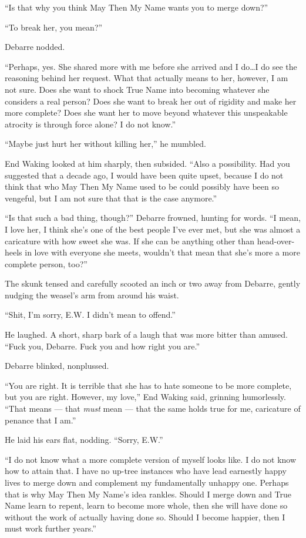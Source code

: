 ``Is that why you think May Then My Name wants you to merge down?''

``To break her, you mean?''

Debarre nodded.

``Perhaps, yes. She shared more with me before she arrived and I do\ldots I do see the reasoning behind her request. What that actually means to her, however, I am not sure. Does she want to shock True Name into becoming whatever she considers a real person? Does she want to break her out of rigidity and make her more complete? Does she want her to move beyond whatever this unspeakable atrocity is through force alone? I do not know.''

``Maybe just hurt her without killing her,'' he mumbled.

End Waking looked at him sharply, then subsided. ``Also a possibility. Had you suggested that a decade ago, I would have been quite upset, because I do not think that who May Then My Name used to be could possibly have been so vengeful, but I am not sure that that is the case anymore.''

``Is that such a bad thing, though?'' Debarre frowned, hunting for words. ``I mean, I love her, I think she's one of the best people I've ever met, but she was almost a caricature with how sweet she was. If she can be anything other than head-over-heels in love with everyone she meets, wouldn't that mean that she's more a more complete person, too?''

The skunk tensed and carefully scooted an inch or two away from Debarre, gently nudging the weasel's arm from around his waist.

``Shit, I'm sorry, E.W. I didn't mean to offend.''

He laughed. A short, sharp bark of a laugh that was more bitter than amused. ``Fuck you, Debarre. Fuck you and how right you are.''

Debarre blinked, nonplussed.

``You are right. It is terrible that she has to hate someone to be more complete, but you are right. However, my love,'' End Waking said, grinning humorlessly. ``That means — that \emph{must} mean — that the same holds true for me, caricature of penance that I am.''

He laid his ears flat, nodding. ``Sorry, E.W.''

``I do not know what a more complete version of myself looks like. I do not know how to attain that. I have no up-tree instances who have lead earnestly happy lives to merge down and complement my fundamentally unhappy one. Perhaps that is why May Then My Name's idea rankles. Should I merge down and True Name learn to repent, learn to become more whole, then she will have done so without the work of actually having done so. Should I become happier, then I must work further years.''

